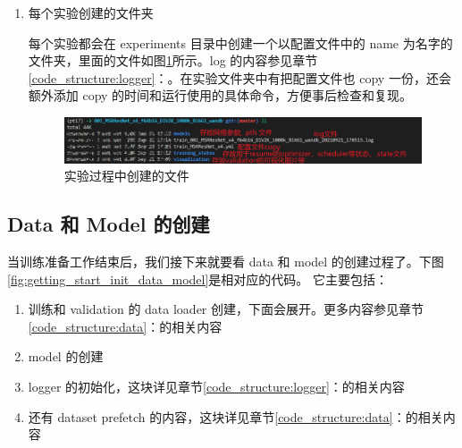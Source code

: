 \documentclass[../main.tex]{subfiles}
\begin{document}
\begin{enumerate}
    \item 每个实验创建的文件夹

          每个实验都会在 experiments 目录中创建一个以配置文件中的 name 为名字的文件夹，里面的文件如图\ref{fig:getting_start_exp_folder}所示。log 的内容参见章节\ref{code_structure:logger}：。在实验文件夹中有把配置文件也 copy 一份，还会额外添加 copy 的时间和运行使用的具体命令，方便事后检查和复现。

          \begin{figure}[h]
              \begin{center}
                  \vspace{-0.2cm}
                  \includegraphics[width=0.9\linewidth]{figures/getting_start_exp_folder.png}
                  \vspace{-0.3cm}
                  \caption{实验过程中创建的文件}
                  \label{fig:getting_start_exp_folder}
              \end{center}
              \vspace{-0.5cm}
          \end{figure}
\end{enumerate}

\subsection{Data 和 Model 的创建}

当训练准备工作结束后，我们接下来就要看 data 和 model 的创建过程了。下图\ref{fig:getting_start_init_data_model}是相对应的代码。
它主要包括：
\begin{enumerate}
    \item 训练和 validation 的 data loader 创建，下面会展开。更多内容参见章节\ref{code_structure:data}：的相关内容
    \item model 的创建
    \item logger 的初始化，这块详见章节\ref{code_structure:logger}：的相关内容
    \item 还有 dataset prefetch 的内容，这块详见章节\ref{code_structure:data}：的相关内容
\end{enumerate}
\end{document}
